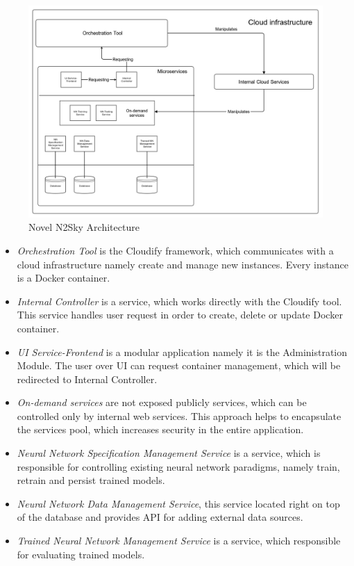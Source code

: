 \begin{figure}[htbp]
\begin{center}
  \includegraphics[width=\linewidth]{components/2/architecture.png}
  \caption{Novel N2Sky Architecture}
  \label{fig:newarch}
\end{center}
\end{figure}

\begin{itemize}
\item \emph{Orchestration Tool} is the Cloudify framework, which communicates with a cloud infrastructure namely create and manage new instances. Every instance is a Docker container.
\item \emph{Internal Controller} is a service, which works directly with the Cloudify tool. This service handles user request in order to create, delete or update Docker container.
\item \emph{UI Service-Frontend} is a modular application namely it is the Administration Module. The user over UI can request container management, which will be redirected to Internal Controller.
\item \emph{On-demand services} are not exposed publicly services, which can be controlled only by internal web services.  This approach helps to encapsulate the services pool, which increases security in the entire application. 
\item \emph{Neural Network Specification Management Service}  is a service, which is responsible for controlling existing neural network paradigms, namely train, retrain and persist trained models.
\item \emph{Neural Network Data Management Service}, this service located right on top of the database and provides API for adding external data sources.
\item \emph{Trained Neural Network Management Service} is a service, which responsible for evaluating trained models.
\end{itemize}


